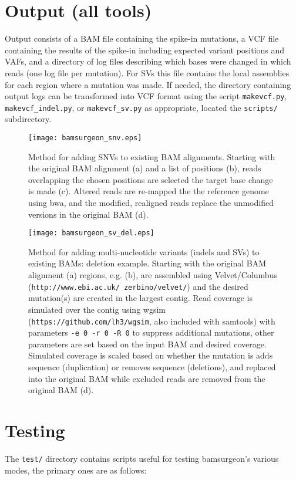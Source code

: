 \documentclass[letterpaper,11pt]{article}
\begin{document}
\section{Output (all tools)}
     Output consists of a BAM file containing the spike-in mutations, a VCF file containing the results of the spike-in including expected variant positions and VAFs, and a directory of log files describing which bases were changed in which reads (one log file per mutation). For SVs this file contains the local assemblies for each region where a mutation was made. If needed, the directory containing output logs can be transformed into VCF format using the script \texttt {makevcf.py}, \texttt {makevcf\_indel.py}, or \texttt {makevcf\_sv.py} as appropriate, located the \texttt {scripts/} subdirectory. 

\newpage %
\begin{figure}[!h]
\centering
\texttt{[image: bamsurgeon\_snv.eps]}
\caption{Method for adding SNVs to existing BAM alignments. Starting with the original BAM alignment (a) and a list of positions (b), reads overlapping the chosen positions are selected the target base change is made (c). Altered reads are re-mapped the the reference genome using bwa, and the modified, realigned reads replace the unmodified versions in the original BAM (d).}
\end{figure}

\newpage %

\begin{figure}[!h]
\centering
\texttt{[image: bamsurgeon\_sv\_del.eps]}
\caption{Method for adding multi-nucleotide variants (indels and SVs) to existing BAMs: deletion example. Starting with the original BAM alignment (a) regions, e.g. (b), are assembled using Velvet/Columbus (\texttt{http://www.ebi.ac.uk/~zerbino/velvet/}) and the desired mutation(s) are created in the largest contig. Read coverage is simulated over the contig using wgsim (\texttt{https://github.com/lh3/wgsim}, also included with samtools) with parameters \texttt{-e 0 -r 0 -R 0} to suppress additional mutations, other parameters are set based on the input BAM and desired coverage. Simulated coverage is scaled based on whether the mutation is adds sequence (duplication) or removes sequence (deletions), and replaced into the original BAM while excluded reads are removed from the original BAM (d).}
\end{figure}

\section{Testing}
The \texttt{test/} directory contains scripts useful for testing bamsurgeon's various modes, the primary ones are as follows:
\end{document}
